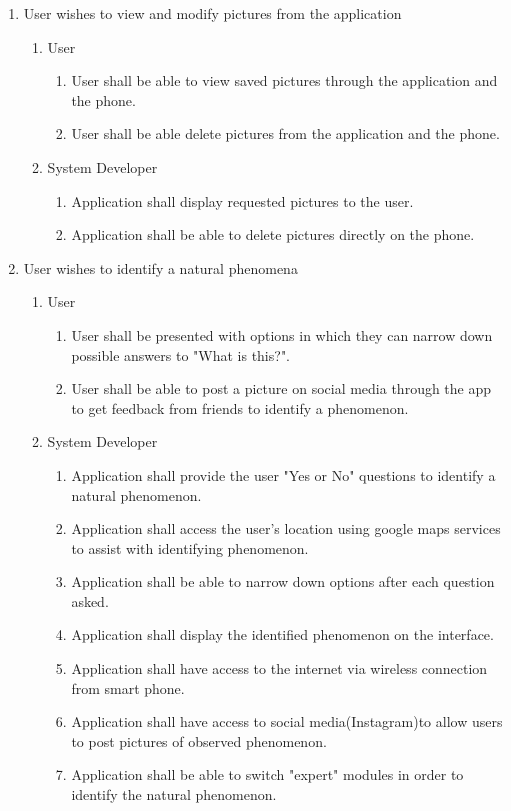 \documentclass[]{article}
\begin{document}
\begin{enumerate}[{BE}1.]
\begin{enumerate}[{VP2}.1]
\begin{enumerate}
			\end{enumerate}
	\end{enumerate}
	\item User wishes to view and modify pictures from the application
	\begin{enumerate} [{VP3}.1]
		\item User
			\begin{enumerate}
				\item User shall be able to view saved pictures through the application and the phone.
				\item User shall be able delete pictures from the application and the phone.
			\end{enumerate}
		\item System Developer
			\begin{enumerate}
				\item Application shall display requested pictures to the user.
				\item Application shall be able to delete pictures directly on the phone.
			\end{enumerate}
	\end{enumerate}
	\item User wishes to identify a natural phenomena
	\begin{enumerate}[{VP4}.1]
		\item User
			\begin{enumerate}
				\item User shall be presented with options in which they can narrow down possible answers to "What is this?".
				\item User shall be able to post a picture on social media through the app to get feedback from friends to identify a phenomenon.
								
			\end{enumerate}
		\item System Developer
			\begin{enumerate}
				\item Application shall provide the user "Yes or No" questions to identify a natural phenomenon.
				\item Application shall access the user's location using google maps services to assist with identifying phenomenon.
				\item Application shall be able to narrow down options after each question asked. 
				\item Application shall display the identified phenomenon on the interface.
				\item Application shall have access to the internet via wireless connection from smart phone.
				\item Application shall have access to social media(Instagram)to allow users to post pictures of observed phenomenon. 
				\item Application shall be able to switch "expert" modules in order to identify the natural phenomenon.
				
			\end{enumerate}
	\end{enumerate}
\end{enumerate}
\end{document}

